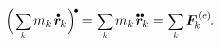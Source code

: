 
\vspace{-0.8em}\noindent
{}

\nopagebreak\vspace{-0.3em}
\begin{equation}\label{balanceoftranslationalmomentum.discretepoints}
\Bigl( \hspace{.2ex}
\scalebox{.8}{$ \displaystyle \sum_{\smash{k}} $} \hspace{.3ex} m_k \hspace{.2ex} \mathdotabove{\locationvector}_{\hspace{-0.1ex}k}
\Bigr)^{\hspace{-0.1em}\tikz[baseline=-0.2ex]\draw[black, fill=black] (0,0) circle (.28ex);} \hspace{-0.15ex}
= \hspace{.1ex} \scalebox{.8}{$ \displaystyle \sum_{\smash{k}} $} \hspace{.3ex} m_k \hspace{.2ex} \mathdotdotabove{\locationvector}_{\hspace{-0.1ex}k}
= \scalebox{.8}{$ \displaystyle \sum_{\smash{k}} $} \hspace{.3ex} \bm{F}^{\smthexternal}_{\hspace{-0.16ex}k}
\hspace{-0.1ex} .
\end{equation}

